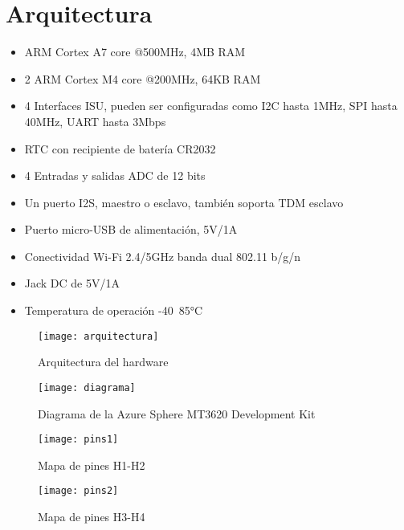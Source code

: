 \section{Arquitectura}
\begin{itemize}
	\item
	ARM Cortex A7 core @500MHz, 4MB RAM
	\item
	2 ARM Cortex M4 core @200MHz, 64KB RAM
	\item
	4 Interfaces ISU, pueden ser configuradas como I2C hasta 1MHz, SPI hasta 40MHz, UART hasta 3Mbps
	\item
	RTC con recipiente de batería CR2032
	\item
	4 Entradas y salidas ADC de 12 bits
	\item
	Un puerto I2S, maestro o esclavo, también soporta TDM esclavo
	\item
	Puerto micro-USB de alimentación, 5V/1A
	\item
	Conectividad Wi-Fi 2.4/5GHz banda dual 802.11 b/g/n
	\item
	Jack DC de 5V/1A
	\item
	Temperatura de operación -40~85°C
\end{itemize}	
\begin{figure}[h]
	\centering
	\texttt{[image: arquitectura]}
	\caption{Arquitectura del hardware}
\end{figure}

\begin{figure}[h]
	\centering
	\texttt{[image: diagrama]}
	\caption{Diagrama de la Azure Sphere MT3620 Development Kit}
\end{figure}

\begin{figure}[h]
	\centering
	\texttt{[image: pins1]}
	\caption{Mapa de pines H1-H2}
\end{figure}

\begin{figure}[h]
	\centering
	\texttt{[image: pins2]}
	\caption{Mapa de pines H3-H4}
\end{figure}